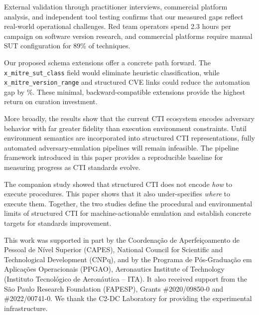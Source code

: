 \documentclass[sigconf,anonymous,review]{acmart}
\begin{document}
External validation through practitioner interviews, commercial platform analysis, and independent tool testing confirms that our measured gaps reflect real-world operational challenges. Red team operators spend 2.3 hours per campaign on software version research, and commercial platforms require manual SUT configuration for 89\% of techniques.

Our proposed schema extensions offer a concrete path forward. The \texttt{x\_mitre\_sut\_class} field would eliminate heuristic classification, while \texttt{x\_mitre\_version\_range} and structured CVE links could reduce the automation gap by \pipelinegappercentage\%. These minimal, backward-compatible extensions provide the highest return on curation investment.

More broadly, the results show that the current CTI ecosystem encodes adversary behavior with far greater fidelity than execution environment constraints. Until environment semantics are incorporated into structured CTI representations, fully automated adversary-emulation pipelines will remain infeasible. The pipeline framework introduced in this paper provides a reproducible baseline for measuring progress as CTI standards evolve.

The companion study showed that structured CTI does not encode \emph{how} to execute procedures. This paper shows that it also under-specifies \emph{where} to execute them. Together, the two studies define the procedural and environmental limits of structured CTI for machine-actionable emulation and establish concrete targets for standards improvement.

\begin{acks}
This work was supported in part by the Coordenação de Aperfeiçoamento de Pessoal de Nível Superior (CAPES), National Council for Scientific and Technological Development (CNPq), and by the Programa de Pós-Graduação em Aplicações Operacionais (PPGAO), Aeronautics Institute of Technology (Instituto Tecnológico de Aeronáutica – ITA). It also received support from the São Paulo Research Foundation (FAPESP), Grants \#2020/09850-0 and \#2022/00741-0. We thank the C2-DC Laboratory for providing the experimental infrastructure.
\end{acks}



\end{document}
